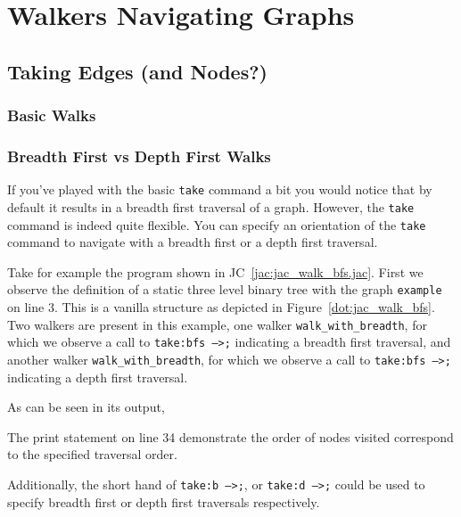 \chapter{Walkers Navigating Graphs}



\section{Taking Edges (and Nodes?)}

\subsection{Basic Walks}

\par
{}

\par
{}

\subsection{Breadth First vs Depth First Walks}
\par
{}
If you've played with the basic \texttt{take} command a bit you would notice that by default it results in a breadth first traversal of a graph.
However, the \texttt{take} command is indeed quite flexible.
You can specify an orientation of the \texttt{take} command to navigate with a breadth first or a depth first traversal.
\par
{}
\par
Take for example the program shown in JC~\ref{jac:jac_walk_bfs.jac}.
First we observe the definition of a static three level binary tree with the graph \texttt{example} on line 3.
This is a vanilla structure as depicted in Figure~\ref{dot:jac_walk_bfs}.
Two walkers are present in this example, one walker \texttt{walk\_with\_breadth}, for which we observe a call to \texttt{take:bfs -->;} indicating a breadth first traversal, and another walker \texttt{walk\_with\_breadth}, for which we observe a call to \texttt{take:bfs -->;} indicating a depth first traversal.
\par
As can be seen in its output,
\par
{}
The print statement on line 34 demonstrate the order of nodes visited correspond to the specified traversal order.
\par
Additionally, the short hand of \texttt{take:b -->;}, or \texttt{take:d -->;} could be used to specify breadth first or depth first traversals respectively.

